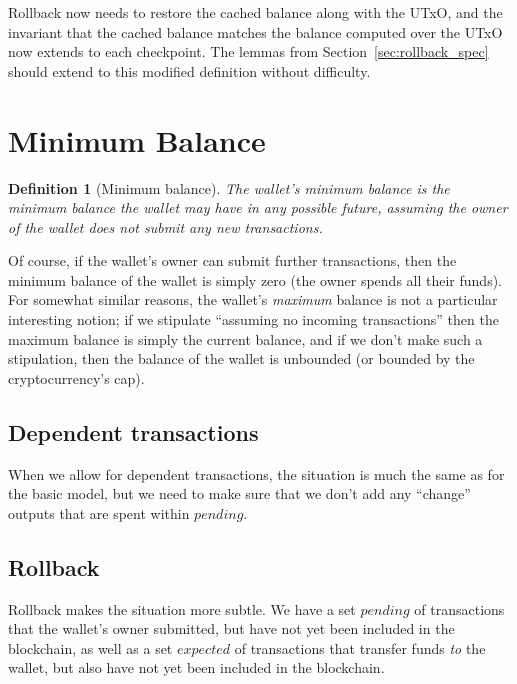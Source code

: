 \documentclass{article}
\newtheorem{definition}{Definition}
\begin{document}
Rollback now needs to restore the cached balance along with the UTxO, and the
invariant that the cached balance matches the balance computed over the UTxO
now extends to each checkpoint. The lemmas from Section~\ref{sec:rollback_spec}
should extend to this modified definition without difficulty.

\section{Minimum Balance}


\begin{definition}[Minimum balance]
The wallet's \emph{minimum balance} is the minimum balance the wallet may have
in any possible future, assuming the owner of the wallet does not submit any
new transactions.
\end{definition}



Of course, if the wallet's owner can submit further transactions, then the
minimum balance of the wallet is simply zero (the owner spends all their
funds). For somewhat similar reasons, the wallet's \emph{maximum} balance
is not a particular interesting notion; if we stipulate ``assuming no
incoming transactions'' then the maximum balance is simply the current balance,
and if we don't make such a stipulation, then the balance of the wallet is
unbounded (or bounded by the cryptocurrency's cap).

\subsection{Dependent transactions}

When we allow for dependent transactions, the situation is much the same as
for the basic model, but we need to make sure that we don't add any ``change''
outputs that are spent within $\mathit{pending}$.

\subsection{Rollback}

Rollback makes the situation more subtle. We have a set $\mathit{pending}$
of transactions that the wallet's owner submitted, but have not yet been
included in the blockchain, as well as a set $\mathit{expected}$ of transactions
that transfer funds \emph{to} the wallet, but also have not yet been included
in the blockchain.
\end{document}
